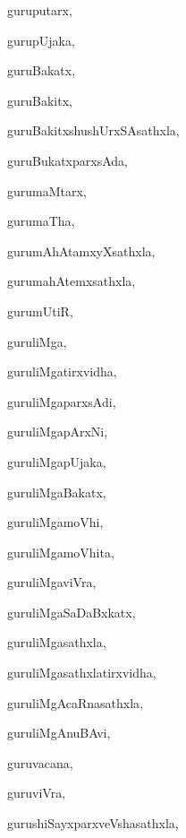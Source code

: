 \begin{multicols}{3}
{\noindent
{guruputarx}, \pageref{guruputarx}

\noindent
{gurupUjaka}, \pageref{gurupUjaka}

\noindent
{guruBakatx}, \pageref{guruBakatx}

\noindent
{guruBakitx}, \pageref{guruBakitx}

\noindent
{guruBakitxshushUrxSAsathxla}, \pageref{guruBakitxshushUrxSAsathxla}

\noindent
{guruBukatxparxsAda}, \pageref{guruBukatxparxsAda}

\noindent
{gurumaMtarx}, \pageref{gurumaMtarx}

\noindent
{gurumaTha}, \pageref{gurumaTha}

\noindent
{gurumAhAtamxyXsathxla}, \pageref{gurumAhAtamxyXsathxla}

\noindent
{gurumahAtemxsathxla}, \pageref{gurumahAtemxsathxla}

\noindent
{gurumUtiR}, \pageref{gurumUtiR}

\noindent
{guruliMga}, \pageref{guruliMga}

\noindent
{guruliMgatirxvidha}, \pageref{guruliMgatirxvidha}

\noindent
{guruliMgaparxsAdi}, \pageref{guruliMgaparxsAdi}

\noindent
{guruliMgapArxNi}, \pageref{guruliMgapArxNi}

\noindent
{guruliMgapUjaka}, \pageref{guruliMgapUjaka}

\noindent
{guruliMgaBakatx}, \pageref{guruliMgaBakatx}

\noindent
{guruliMgamoVhi}, \pageref{guruliMgamoVhi}

\noindent
{guruliMgamoVhita}, \pageref{guruliMgamoVhita}

\noindent
{guruliMgaviVra}, \pageref{guruliMgaviVra}

\noindent
{guruliMgaSaDaBxkatx}, \pageref{guruliMgaSaDaBxkatx}

\noindent
{guruliMgasathxla}, \pageref{guruliMgasathxla}

\noindent
{guruliMgasathxlatirxvidha}, \pageref{guruliMgasathxlatirxvidha}

\noindent
{guruliMgAcaRnasathxla}, \pageref{guruliMgAcaRnasathxla}

\noindent
{guruliMgAnuBAvi}, \pageref{guruliMgAnuBAvi}

\noindent
{guruvacana}, \pageref{guruvacana}

\noindent
{guruviVra}, \pageref{guruviVra}

\noindent
{gurushiSayxparxveVshasathxla}, \pageref{gurushiSayxparxveVshasathxla}

}
\end{multicols}
